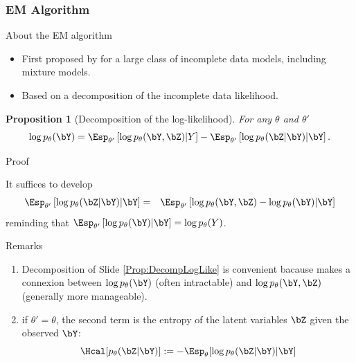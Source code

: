 \documentclass[compress,10pt]{beamer}
\newtheorem{proposition}{Proposition}
\begin{document}
\subsubsection{EM Algorithm}

\begin{frame}{About the EM algorithm}

\begin{itemize}
 \item First proposed by \cite{Dempster77} for a large class of incomplete data models, including mixture models. 
 \item Based on a decomposition of the incomplete data likelihood.
\end{itemize}
\label{Prop:DecompLogLike}
\begin{proposition}[Decomposition of the log-likelihood] 
For any $\theta$ and $\theta'$
  $$
  \log p_\theta(\bY) = \Esp_{\theta'}\left[\log p_\theta(\bY, \bZ) | Y\right] - \Esp_{\theta'}\left[\log p_\theta(\bZ |\bY)|\bY\right].
  $$	
\end{proposition}
\end{frame}

\begin{frame}{Proof}

It suffices to develop
\begin{eqnarray*}
 \Esp_{\theta'}\left[\log p_\theta(\bZ|\bY) | \bY\right] & = &  \Esp_{\theta'}\left[\log p_\theta(\bY, \bZ) - \log p_\theta(\bY) |\bY \right]\\
 \end{eqnarray*}
reminding that $\Esp_{\theta'}\left[\log p_\theta(\bY) |\bY \right] = \log p_\theta(Y)$.

\end{frame}
 
\begin{frame}{Remarks}

\begin{enumerate}
 \item Decomposition of  Slide \ref{Prop:DecompLogLike}   is convenient  bacause makes a  connexion between   $\log p_\theta(\bY)$ (often intractable) and  $\log p_\theta(\bY, \bZ)$ (generally more manageable).
 \item if $\theta' = \theta$, the second term is  the entropy of the latent variables $\bZ$ given the observed $\bY$: $$\Hcal[p_{\theta}(\bZ|\bY)] := - \Esp_{\theta}[\log p_{\theta}(\bZ|\bY) | \bY]$$
\end{enumerate}
\end{frame}
\end{document}
